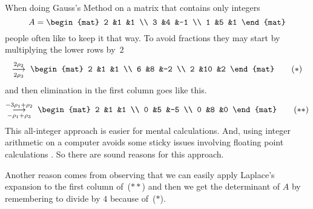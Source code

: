
When doing Gauss's Method on a matrix that contains only integers
\begin{equation*}
  A=
  \begin{mat}
    2 &1 &1 \\
    3 &4 &-1 \\
    1 &5 &1 
  \end{mat}
\end{equation*}
people often like to keep it that way.
To avoid fractions they may start by multiplying the lower rows
by~$2$
\begin{equation*}
  \grstep[2\rho_3]{2\rho_2}\;
  \begin{mat}
    2 &1 &1 \\
    6 &8 &-2 \\
    2 &10 &2 
  \end{mat}
  \tag{$*$}
\end{equation*}
and then elimination in the first column goes like this.
\begin{equation*}
  \grstep[-\rho_1+\rho_3]{-3\rho_1+\rho_2}\;
  \begin{mat}
    2 &1 &1 \\
    0 &5 &-5 \\
    0 &8 &0 
  \end{mat}
  \tag{$**$}
\end{equation*}
This all-integer approach is easier for mental calculations. 
And, using integer arithmetic on a computer
avoids some sticky issues involving floating point calculations \cite{Kahan}.
So there are sound reasons for this approach.

Another reason comes from
observing that we can easily apply Laplace's expansion to the 
first column of~($**$) and then we get the determinant of $A$ by 
remembering to divide by $4$ because of~($*$).


